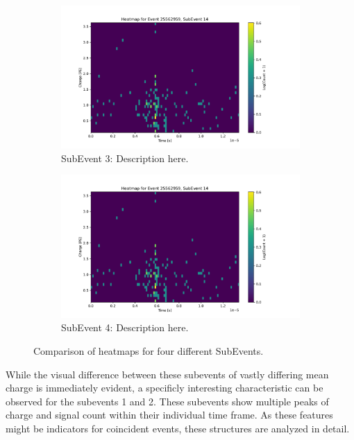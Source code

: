 \begin{figure}[h!]
    \vspace{0.5cm} %
    \begin{subfigure}[t]{0.49\textwidth}
        \centering
        \includegraphics[width=\textwidth]{Plots/heatmap_subevent_random_1.pdf}
        \caption{SubEvent 3: Description here.}
        \label{fig:subevent3}
    \end{subfigure}
    \hfill
    \begin{subfigure}[t]{0.49\textwidth}
        \centering
        \includegraphics[width=\textwidth]{Plots/heatmap_subevent_random_1.pdf}
        \caption{SubEvent 4: Description here.}
        \label{fig:subevent4}
    \end{subfigure}

    \caption{Comparison of heatmaps for four different SubEvents. }
    \label{fig:subevent_charge_time}
\end{figure}

While the visual difference between these subevents of vastly differing mean charge is immediately evident, a specificly interesting characteristic can be 
observed for the subevents 1 and 2. These subevents show multiple peaks of charge and signal count within their individual time frame. As these features
might be indicators for coincident events, these structures are analyzed in detail. 

